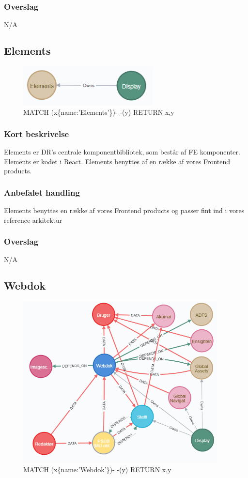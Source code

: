 \documentclass{article}
\begin{document}
\subsubsection{Overslag}
N/A

\subsection{Elements}
\begin{figure}[h]
\includegraphics[width=200pt]{Elements.PNG}
\caption{MATCH (x\{name:'Elements'\})- -(y) RETURN x,y}
\end{figure}
\subsubsection{Kort beskrivelse}
Elements er DR's centrale komponentbibliotek, som består af FE komponenter. Elements er kodet i React. Elements benyttes af en række af vores Frontend products.
\subsubsection{Anbefalet handling}
Elements benyttes en række af vores Frontend products og passer fint ind i vores reference arkitektur
\subsubsection{Overslag}
N/A

\subsection{Webdok}
\begin{figure}[h]
\includegraphics[width=300pt]{Webdok.PNG}
\caption{MATCH (x\{name:'Webdok'\})- -(y) RETURN x,y}
\end{figure}
\end{document}

